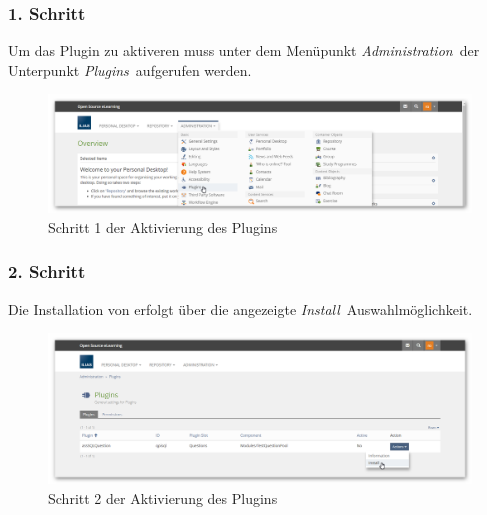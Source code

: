     \subsubsection{1. Schritt}
    
        Um das Plugin zu aktiveren muss unter dem Menüpunkt \glqq\textit{Administration}\grqq\ der Unterpunkt \glqq\textit{Plugins}\grqq\ aufgerufen werden.
        
            \begin{figure}[H]
                \begin{center}
                    \includegraphics[page=1, width=0.7\paperwidth, trim=4 4 4 4, clip]{fig/Schritt-1-Aktivierung.png} 
                    \caption{Schritt 1 der Aktivierung des  Plugins}
                    \label{fig:schritt-1-aktivierung}
                \end{center}
            \end{figure}
    
    \subsubsection{2. Schritt}
    
        Die Installation von  erfolgt über die angezeigte \glqq\textit{Install}\grqq\ Auswahlmöglichkeit.
        
            \begin{figure}[H]
                \begin{center}
                    \includegraphics[page=1, width=0.7\paperwidth, trim=4 4 4 4, clip]{fig/Schritt-2-Aktivierung.png} 
                    \caption{Schritt 2 der Aktivierung des  Plugins}
                    \label{fig:schritt-2-aktivierung}
                \end{center}
            \end{figure}
    
